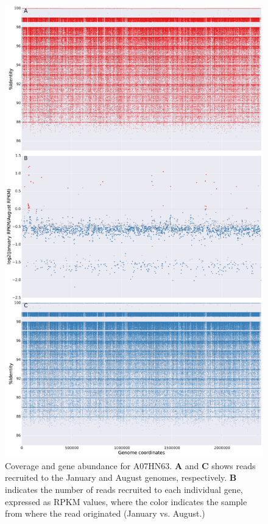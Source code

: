 \begin{figure}[!hbtp]
  \centering
  \includegraphics[width=\textwidth,height=0.8\textheight,keepaspectratio]{Chapter5/Figures/coverage_plots/A07HN63_coverage.pdf}
  \caption{Coverage and gene abundance for A07HN63. \textbf{A} and \textbf{C} shows reads recruited to the January and August genomes, respectively. \textbf{B} indicates the number of reads recruited to each individual gene, expressed as RPKM values, where the color indicates the sample from where the read originated (January vs. August.)}
  \label{A07HN63coverage}
\end{figure}

